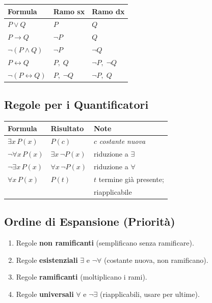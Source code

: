 \documentclass[10pt,a4paper]{article}
\newcommand{\liff}{\leftrightarrow}
\begin{document}
\begin{tabular}{@{}lll@{}}
  \toprule
  \textbf{Formula} & \textbf{Ramo sx} & \textbf{Ramo dx} \\
  \midrule
  $P \lor Q$ & $P$ & $Q$ \\
  $P \to Q$ & $\lnot P$ & $Q$ \\
  $\lnot(P \land Q)$ & $\lnot P$ & $\lnot Q$ \\
  $P \liff Q$ & $P,\; Q$ & $\lnot P,\; \lnot Q$ \\
  $\lnot(P \liff Q)$ & $P,\; \lnot Q$ & $\lnot P,\; Q$ \\
  \bottomrule
\end{tabular}

\subsection{Regole per i Quantificatori}

\begin{tabular}{@{}lll@{}}
  \toprule
  \textbf{Formula} & \textbf{Risultato} & \textbf{Note} \\
  \midrule
  $\exists x\, P(x)$ & $P(c)$ & $c$ \emph{costante nuova} \\
  $\lnot\forall x\, P(x)$ & $\exists x\, \lnot P(x)$ & riduzione a $\exists$ \\
  $\lnot\exists x\, P(x)$ & $\forall x\, \lnot P(x)$ & riduzione a $\forall$ \\
  $\forall x\, P(x)$ & $P(t)$ & $t$ termine già presente;\\
                     &        & riapplicabile \\
  \bottomrule
\end{tabular}

\subsection{Ordine di Espansione (Priorità)}

\begin{attenzione}
\begin{enumerate}[leftmargin=*, itemsep=1pt, topsep=0pt]
  \item Regole \textbf{non ramificanti} (semplificano senza ramificare).
  \item Regole \textbf{esistenziali} $\exists$ e $\lnot\forall$
    (costante nuova, non ramificano).
  \item Regole \textbf{ramificanti} (moltiplicano i rami).
  \item Regole \textbf{universali} $\forall$ e $\lnot\exists$
    (riapplicabili, usare per ultime).
\end{enumerate}
\end{attenzione}
\end{document}
